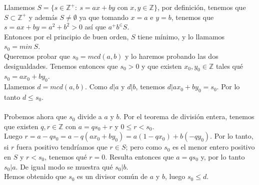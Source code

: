 \documentclass{report}
\begin{document}
\begin{myproof}
	Llamemos $S=\{s\in\mathbb{Z}^+:\ s=ax+by \text{ con }x,y\in\mathbb{Z}\}$, por definición, tenemos que $S\subset\mathbb{Z}^+$ y además $S\neq\emptyset$ ya que tomando $x=a$ e $y=b$, tenemos que $s=ax+by=a^2+b^2>0$ así que $a^+b^\in S$.\\
	Entonces por el principio de buen orden, $S$ tiene mínimo, y lo llamamos $s_0=min\ S$.\\Queremos probar que $s_0=mcd(a,b)$ y lo haremos probando las dos desigualdades. Tenemos entonces que $s_0>0$ y que existen $x_0,y_0\in\mathbb{Z}$ tales qué $s_0=ax_0+by_0$.\\Llamemos $d=mcd(a,b)$. Como $d|a$ y $d|b$, tenemos $d|ax_0+by_0=s_0$. Por lo tanto $d\le s_0$.\\\\
	Probemos ahora que $s_0$ divide a $a$ y $b$. Por el teorema de división entera, tenemos que existen $q,r\in\mathbb{Z}$ con $a=qs_0+r$ y $0\le r<s_0$.\\Luego $r=a-qs_0=a-q(ax_0+by_0)=a(1-qx_0)+b(-qy_0)$. Por lo tanto, si $r$ fuera positivo tendríamos que $r\in S$; pero como $s_0$ es el menor entero positivo en $S$ y $r<s_0$, tenemos qué $r=0$. Resulta entonces que $a=qs_0$ y, por lo tanto $s_0|a$. De igual modo se muestra qué $s_0|b$.\\Hemos obtenido que $s_0$ es un divisor común de $a$ y $b$, luego $s_0\le d$.
\end{myproof}
\end{document}

